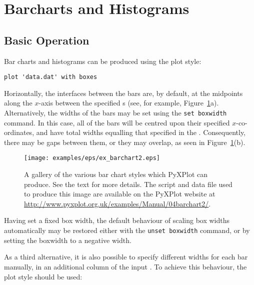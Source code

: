 \section{Barcharts and Histograms}
\label{barcharts}

\subsection{Basic Operation}

Bar charts and histograms can be produced using the  plot style:

\begin{verbatim} 
plot 'data.dat' with boxes
\end{verbatim}

\noindent Horizontally, the interfaces between the bars are, by default, at the
midpoints along the $x$-axis between the specified \datapoint s (see, for
example, Figure~\ref{fig:ex_barchart2}a).  Alternatively, the widths of the
bars may be set using the {\tt set boxwidth} command. In this case, all of
the bars will be centred upon their specified $x$-co-ordinates, and have total
widths equalling that specified in the . Consequently, there may be
gaps between them, or they may overlap, as seen in
Figure~\ref{fig:ex_barchart2}(b).

\begin{figure}
\begin{center}
\texttt{[image: examples/eps/ex\_barchart2.eps]}
\end{center}
\caption[A gallery of the various bar chart styles which PyXPlot can produce]
{A gallery of the various bar chart styles which PyXPlot can produce.
See the text for more details.  The script and data file used to produce this
image are available on the PyXPlot website at
\protect\url{http://www.pyxplot.org.uk/examples/Manual/04barchart2/}.}
\label{fig:ex_barchart2}
\end{figure}

Having set a fixed box width, the default behaviour of scaling box widths
automatically may be restored either with the {\tt unset boxwidth} command,
or by setting the boxwidth to a negative width.

As a third alternative, it is also possible to specify different widths for
each bar manually, in an additional column of the input \datafile. To achieve
this behaviour, the  plot style should be used:

